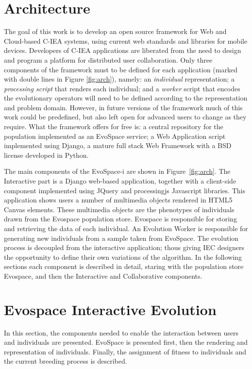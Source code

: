 \documentclass{sig-alternate}
\begin{document}
\section{Architecture}
The goal of this work is to develop an open source framework for Web and Cloud-based C-IEA systems, using current web standards and libraries for mobile devices.
Developers of C-IEA applications are liberated from the need to design and program a platform for distributed user collaboration.
Only three components of the framework  must to be defined for each
application (marked with double lines in Figure \ref{fig:arch}), namely: an \emph{individual} representation; a \emph{processing script} that renders each individual; and a \emph{worker} script that encodes the evolutionary operators will need to be defined according to the representation and problem domain.
However, in future versions of the framework much of this work could be predefined, but also left open for advanced users to change as they require.
What the framework offers for free is: a central repository for the population implemented as an EvoSpace service; a Web Application script implemented using Django, a mature full stack Web Framework with a BSD license developed in Python.


The main components of the EvoSpace-i are shown in Figure~\ref{fig:arch}. The Interactive part is a Django \cite{django} web-based application, together with a client-side component implemented using JQuery and processingjs Javascript libraries. This application shows users a number of multimedia objects rendered in HTML5 Canvas elements. These multimedia objects are the phenotypes of individuals drawn from the Evospace population store. Evospace is responsible for storing and retrieving the data of each individual. An Evolution Worker is responsible for generating new individuals from a sample taken from EvoSpace. The evolution process is decoupled from the interactive application; thous giving IEC designers the opportunity to define their own variations of the algorithm. In the following sections each component is described in detail, staring with the population store Evospace, and then the Interactive and Collaborative components.



\section{Evospace Interactive Evolution}
In this section, the components needed to enable the interaction between users and individuals are presented. EvoSpace is presented first, then the rendering and representation of individuals. Finally, the assignment of fitness to individuals and the current breeding process is described.
\end{document}
